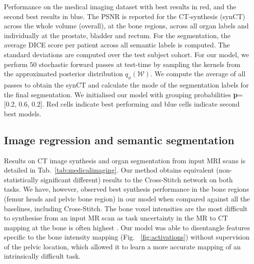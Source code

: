 \begin{table}[t!]
\caption{\footnotesize Performance on the medical imaging dataset with best results in red, and the second best results in blue. The PSNR is reported for the CT-synthesis (synCT) across the whole volume (overall), at the bone regions, across all organ labels and individually at the prostate, bladder and rectum. For the segmentation, the average DICE score per patient across all semantic labels is computed. The standard deviations are computed over the test subject cohort. For our model, we perform $50$ stochastic forward passes at test-time by sampling the kernels from the approximated posterior distribution $q_{\phi}(\mathcal{W})$. We compute the average of all passes to obtain the synCT and calculate the mode of the segmentation labels for the final segmentation. We initialised our model with grouping probabilities \textbf{p}=[0.2, 0.6, 0.2]. Red cells indicate best performing and blue cells indicate second best models. }
\label{tab:medicalimaging}
\end{table}


\subsection{Image regression and semantic segmentation}
Results on CT image synthesis and organ segmentation from input MRI scans is detailed in Tab.~\ref{tab:medicalimaging}. Our method obtains equivalent (non-statistically significant different) results to the Cross-Stitch network \cite{MisraCrossMTL16} on both tasks. We have, however, observed best synthesis performance in the bone regions (femur heads and pelvic bone region) in our model when compared against all the baselines, including Cross-Stitch. The bone voxel intensities are the most difficult to synthesise from an input MR scan as task uncertainty in the MR to CT mapping at the bone is often highest \cite{bragman2018multi}. Our model was able to disentangle features specific to the bone intensity mapping (Fig.~ \ref{fig:activations}) without supervision of the pelvic location, which allowed it to learn a more accurate mapping of an intrinsically difficult task. 


